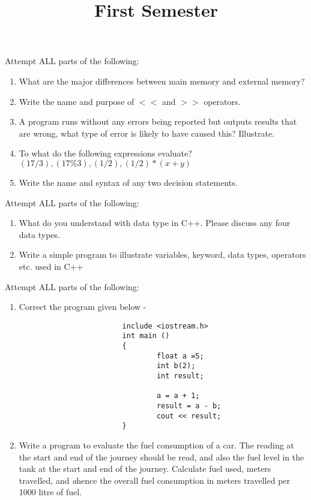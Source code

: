 \documentclass[11pt]{article}
\title{First Semester}
\begin{document}
 
\vspace{-1cm}
\begin{questions}
\question Attempt ALL parts of the following: 
        \begin{enumerate}
\item What are the major differences between main memory and external memory?                                                   
\item Write the name and purpose of $<<$ and $>>$ operators.                            
\item A program runs without any errors being reported but outputs results that are wrong, what type of error is likely to have caused this? Illustrate.                   
\item To what do the following expressions evaluate? $(17/3), (17\%3), (1/2), (1/2)*(x+y)$
\item Write the name and syntax of any two decision statements.
        
        \end{enumerate}
\vspace{-0.2cm}
\question Attempt ALL parts of the following: 
\begin{enumerate}
\item   What do you understand with data type in C++. Please discuss any four data types.
\item Write a simple program to illustrate variables, keyword, data types, operators etc. used in C++                                                                      
\end{enumerate}
\vspace{-0.2cm}
\question  Attempt ALL parts of the following: 
\vspace{-0.2cm}
\begin{enumerate}                        
\item
Correct the program given below -                                                       
                     \begin{verbatim}
                        include <iostream.h>
                        int main ()
                        {
                                float a =5; 
                                int b(2);
                                int result;

                                a = a + 1;
                                result = a - b;
                                cout << result;
                        }
                \end{verbatim}
        \item Write a program to evaluate the fuel consumption of a car. The
reading at the start and end of the journey should be read, and also
the fuel level in the tank at the start and end of the journey. Calculate
fuel used, meters travelled, and \textsl{a}hence the overall fuel consumption in
meters travelled per 1000 litre of fuel.
\end{enumerate}


\end{questions}
\end{document}
